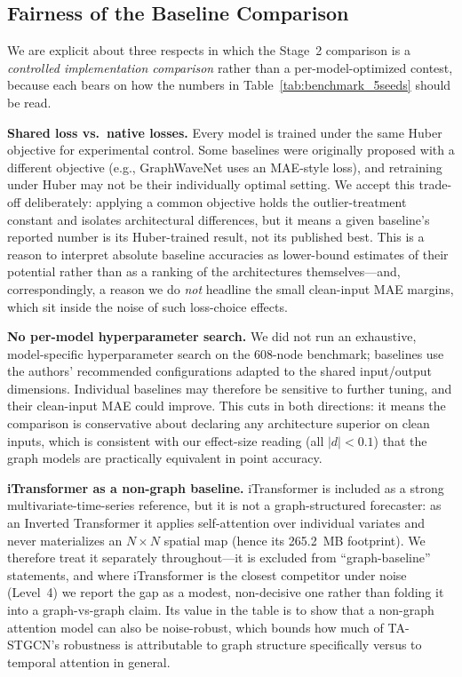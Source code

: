 \documentclass[journal,twocolumn]{IEEEtran}
\begin{document}
\subsection{Fairness of the Baseline Comparison}
We are explicit about three respects in which the Stage~2 comparison is a \emph{controlled implementation comparison} rather than a per-model-optimized contest, because each bears on how the numbers in Table~\ref{tab:benchmark_5seeds} should be read.

\textbf{Shared loss vs.\ native losses.} Every model is trained under the same Huber objective for experimental control. Some baselines were originally proposed with a different objective (e.g., GraphWaveNet uses an MAE-style loss), and retraining under Huber may not be their individually optimal setting. We accept this trade-off deliberately: applying a common objective holds the outlier-treatment constant and isolates architectural differences, but it means a given baseline's reported number is its Huber-trained result, not its published best. This is a reason to interpret absolute baseline accuracies as lower-bound estimates of their potential rather than as a ranking of the architectures themselves---and, correspondingly, a reason we do \emph{not} headline the small clean-input MAE margins, which sit inside the noise of such loss-choice effects.

\textbf{No per-model hyperparameter search.} We did not run an exhaustive, model-specific hyperparameter search on the 608-node benchmark; baselines use the authors' recommended configurations adapted to the shared input/output dimensions. Individual baselines may therefore be sensitive to further tuning, and their clean-input MAE could improve. This cuts in both directions: it means the comparison is conservative about declaring any architecture superior on clean inputs, which is consistent with our effect-size reading (all $|d|<0.1$) that the graph models are practically equivalent in point accuracy.

\textbf{iTransformer as a non-graph baseline.} iTransformer is included as a strong multivariate-time-series reference, but it is not a graph-structured forecaster: as an Inverted Transformer it applies self-attention over individual variates and never materializes an $N\times N$ spatial map (hence its 265.2~MB footprint). We therefore treat it separately throughout---it is excluded from ``graph-baseline'' statements, and where iTransformer is the closest competitor under noise (Level~4) we report the gap as a modest, non-decisive one rather than folding it into a graph-vs-graph claim. Its value in the table is to show that a non-graph attention model can also be noise-robust, which bounds how much of TA-STGCN's robustness is attributable to graph structure specifically versus to temporal attention in general.
\end{document}
